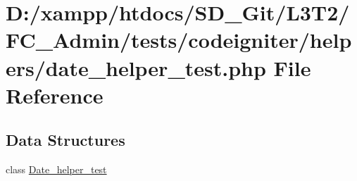 \hypertarget{_admin_2tests_2codeigniter_2helpers_2date__helper__test_8php}{}\section{D\+:/xampp/htdocs/\+S\+D\+\_\+\+Git/\+L3\+T2/\+F\+C\+\_\+\+Admin/tests/codeigniter/helpers/date\+\_\+helper\+\_\+test.php File Reference}
\label{_admin_2tests_2codeigniter_2helpers_2date__helper__test_8php}
\subsection*{Data Structures}
\begin{DoxyCompactItemize}
\item 
class \hyperlink{class_date__helper__test}{Date\+\_\+helper\+\_\+test}
\end{DoxyCompactItemize}
